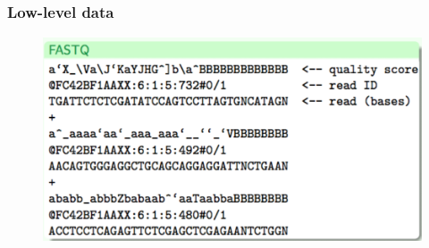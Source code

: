 


\begin{frame}
\frametitle{Low-level data}

	\begin{figure}
                \includegraphics[width=\textwidth]{Pics/fastq.png}
        \end{figure}

\end{frame}




